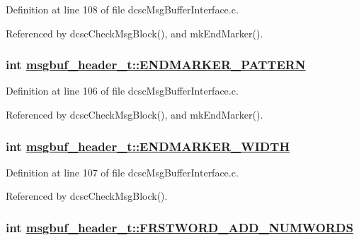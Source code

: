 Definition at line 108 of file dcsc\-Msg\-Buffer\-Interface.c.

Referenced by dcsc\-Check\-Msg\-Block(), and mk\-End\-Marker().\hypertarget{structmsgbuf__header__t_7d2334426b81bda2f4be01720f9d0e58}{
\subsubsection[ENDMARKER\_\-PATTERN]{\setlength{\rightskip}{0pt plus 5cm}int \hyperlink{structmsgbuf__header__t_7d2334426b81bda2f4be01720f9d0e58}{msgbuf\_\-header\_\-t::ENDMARKER\_\-PATTERN}}}
\label{structmsgbuf__header__t_7d2334426b81bda2f4be01720f9d0e58}




Definition at line 106 of file dcsc\-Msg\-Buffer\-Interface.c.

Referenced by dcsc\-Check\-Msg\-Block(), and mk\-End\-Marker().\hypertarget{structmsgbuf__header__t_e836817a10c51af80bd6602a6d064088}{
\subsubsection[ENDMARKER\_\-WIDTH]{\setlength{\rightskip}{0pt plus 5cm}int \hyperlink{structmsgbuf__header__t_e836817a10c51af80bd6602a6d064088}{msgbuf\_\-header\_\-t::ENDMARKER\_\-WIDTH}}}
\label{structmsgbuf__header__t_e836817a10c51af80bd6602a6d064088}




Definition at line 107 of file dcsc\-Msg\-Buffer\-Interface.c.

Referenced by dcsc\-Check\-Msg\-Block().\hypertarget{structmsgbuf__header__t_c96868f83c9b95da536f668edbb3f9db}{
\subsubsection[FRSTWORD\_\-ADD\_\-NUMWORDS]{\setlength{\rightskip}{0pt plus 5cm}int \hyperlink{structmsgbuf__header__t_c96868f83c9b95da536f668edbb3f9db}{msgbuf\_\-header\_\-t::FRSTWORD\_\-ADD\_\-NUMWORDS}}}
\label{structmsgbuf__header__t_c96868f83c9b95da536f668edbb3f9db}




